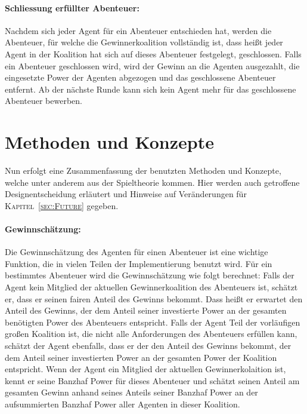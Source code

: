 \documentclass[fleqn,10pt]{SelfArx} %
\newcommand{\ChapterCite}[1]{\textsc{Kapitel~\ref{#1}}}
\begin{document}
\paragraph{Schliessung erfüllter Abenteuer:}
Nachdem sich jeder Agent für ein Abenteuer entschieden hat, werden die Abenteuer, für welche die Gewinnerkoalition vollständig ist, dass heißt jeder Agent in der Koalition hat sich auf dieses Abenteuer festgelegt, geschlossen. Falls ein Abenteuer geschlossen wird, wird der Gewinn an die Agenten ausgezahlt, die eingesetzte Power der Agenten abgezogen und das geschlossene Abenteuer entfernt. Ab der nächste Runde kann sich kein Agent mehr für das geschlossene Abenteuer bewerben.


\section{Methoden und Konzepte}
\label{sec:Methoden}
Nun erfolgt eine Zusammenfassung der benutzten Methoden und Konzepte, welche unter anderem aus der Spieltheorie kommen. Hier werden auch getroffene Designentscheidung erläutert und Hinweise auf Veränderungen für \ChapterCite{sec:Future} gegeben.

\paragraph{Gewinnschätzung:}
Die Gewinnschätzung des Agenten für einen Abenteuer ist eine wichtige Funktion, die in vielen Teilen der Implementierung benutzt wird.
Für ein bestimmtes Abenteuer wird die Gewinnschätzung wie folgt berechnet: Falls der Agent kein Mitglied der aktuellen Gewinnerkoalition des Abenteuers ist, schätzt er, dass er seinen fairen Anteil des Gewinns bekommt. Dass heißt er erwartet den Anteil des Gewinns, der dem Anteil seiner investierte Power an der gesamten benötigten Power des Abenteuers entspricht. Falls der Agent Teil der vorläufigen großen Koalition ist, die nicht alle Anforderungen des Abenteuers erfüllen kann, schätzt der Agent ebenfalls, dass er der den Anteil des Gewinns bekommt, der dem Anteil seiner investierten Power an der gesamten Power der Koalition entspricht. Wenn der Agent ein Mitglied der aktuellen Gewinnerkolaition ist, kennt er seine Banzhaf Power für dieses Abenteuer und schätzt seinen Anteil am gesamten Gewinn anhand seines Anteils seiner Banzhaf Power an der aufsummierten Banzhaf Power aller Agenten in dieser Koalition.
\end{document}
